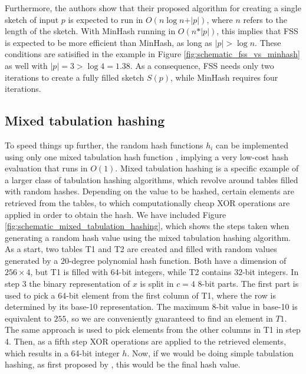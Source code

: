 Furthermore, the authors show that their proposed algorithm for creating a single sketch of input $p$ is expected to run in $O(n\log{n} +  \vert p \vert)$, where $n$ refers to the length of the sketch. With MinHash running in $O(n * \vert p \vert)$, this implies that FSS is expected to be more efficient than MinHash, as long as $\vert p \vert > \log{n}$. These conditions are satisified in the example in Figure \ref{fig:schematic_fss_vs_minhash} as well with $\vert p \vert=3> \log{4} = 1.38$. As a consequence, FSS needs only two iterations to create a fully filled sketch $S(p)$, while MinHash requires four iterations.

\subsection{Mixed tabulation hashing}
\label{subsec:mixed_tab}

To speed things up further, the random hash functions $h_i$ can be implemented using only one mixed tabulation hash function \citep{DahlgaardKRT15}, implying a very low-cost hash evaluation that runs in $O(1)$. Mixed tabulation hashing is a specific example of a larger class of tabulation hashing algorithms, which revolve around tables filled with random hashes. Depending on the value to be hashed, certain elements are retrieved from the tables, to which computationally cheap XOR operations are applied in order to obtain the hash. We have included Figure \ref{fig:schematic_mixed_tabulation_hashing}, which shows the steps taken when generating a random hash value using the mixed tabulation hashing algorithm. As a start, two tables T1 and T2 are created and filled with random values generated by a $20$-degree polynomial hash function. Both have a dimension of $256 \times 4$, but T1 is filled with $64$-bit integers, while T2 contains $32$-bit integers. In step $3$ the binary representation of $x$ is split in $c=4$ $8$-bit parts. The first part is used to pick a 64-bit element from the first column of T1, where the row is determined by its base-10 representation. The maximum $8$-bit value in base-10 is equivalent to $255$, so we are conveniently guaranteed to find an element in $T1$. The same approach is used to pick elements from the other columns in T1 in step 4. Then, as a fifth step XOR operations are applied to the retrieved elements, which results in a 64-bit integer $h$. Now, if we would be doing simple tabulation hashing, as first proposed by \cite{zobrist1970new}, this would be the final hash value. 

